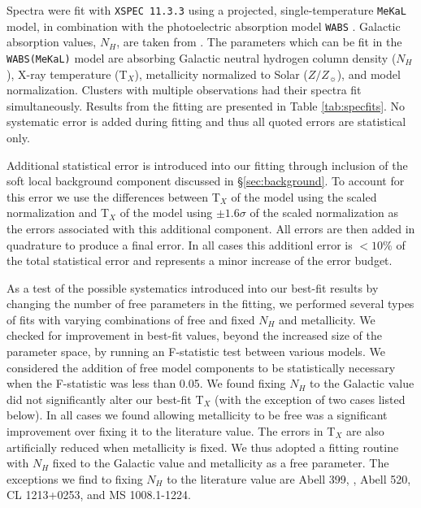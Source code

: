 \documentclass{emulateapj}
\begin{document}
Spectra were fit with {\tt XSPEC 11.3.3}
\citep{1996ASPC..101...17A} using a projected, single-temperature
{\tt MeKaL} model, in combination with the photoelectric
absorption model {\tt WABS} \citep{1983ApJ...270..119M}. Galactic
absorption values, $N_H$, are taken from
\cite{1990ARA&A..28..215D}. The parameters which can be fit in the
{\tt WABS(MeKaL)} model are absorbing Galactic neutral hydrogen column
density ($N_H$), X-ray temperature (T$_{X}$), metallicity normalized
to Solar ($Z/Z_{\sun}$), and model normalization.
Clusters with multiple observations had their spectra fit simultaneously.
Results from the fitting are presented in Table \ref{tab:specfits}. No
systematic error is added during fitting and thus all quoted errors
are statistical only.

Additional statistical error is introduced into our fitting through inclusion of
the soft local background component discussed in
\S\ref{sec:background}. To account for this error we use the
differences between T$_{X}$ of the model using the scaled 
normalization and T$_{X}$ of the model using $\pm1.6\sigma$ of the
scaled normalization as the errors associated with this additional
component. All errors are then added in quadrature to produce a final
error. In all cases this additionl error is $< 10\%$ of the total
statistical error and represents a minor increase of the error budget.

As a test of the possible systematics introduced into our best-fit
results by changing the number of free parameters in the fitting, we
performed several types of fits with varying combinations of free and
fixed $N_H$ and metallicity. We checked for improvement in best-fit
values, beyond the increased size of the parameter space, by running
an F-statistic test between various models. We
considered the addition of free model components to be statistically
necessary when the F-statistic was less than 0.05. We found fixing
$N_H$ to the Galactic value did not significantly alter our best-fit
T$_X$ (with the exception of two cases listed below). In all cases we
found allowing metallicity to be free was a significant improvement
over fixing it to the literature value. The errors in T$_X$ are also
artificially reduced when metallicity is fixed. We thus adopted a
fitting routine with $N_H$ fixed to the Galactic value and
metallicity as a free parameter. The exceptions we find to fixing
$N_H$ to the literature value are  Abell 399,
\citep{2004MNRAS.351.1439S}, Abell 520, CL 1213+0253, and MS
1008.1-1224.

\end{document}

